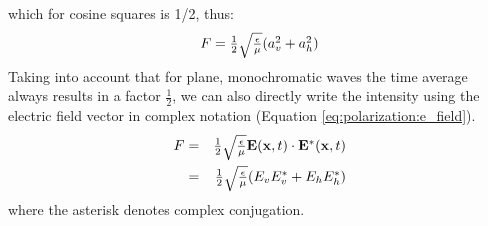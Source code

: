 which for cosine squares is 1/2, thus:
\begin{equation}
  \label{eq:polarization:intensity2}
 F = 
  \textstyle\frac{1}{2}\sqrt{\frac{\epsilon}{\mu}}(
    a_v^2 + a_h^2)  
\end{equation}
Taking into account that for plane, monochromatic waves 
the time average always results in a factor
$\frac{1}{2}$, we can also directly write the intensity using the
electric field vector in complex notation
(Equation \ref{eq:polarization:e_field}).
\begin{eqnarray}
  \label{eq:polarization:intensity_from_complex}
  F &=&  \textstyle\frac{1}{2}\sqrt{\frac{\epsilon}{\mu}} \mathbf{E} (\mathbf{x},t) 
          \cdot \mathbf{E}^\ast (\mathbf{x},t)\\ \nonumber
    &=&   \textstyle\frac{1}{2}\sqrt{\frac{\epsilon}{\mu}}
          (E_v E_v^\ast + E_h E_h^\ast)
\end{eqnarray}
where the asterisk denotes complex conjugation.%

